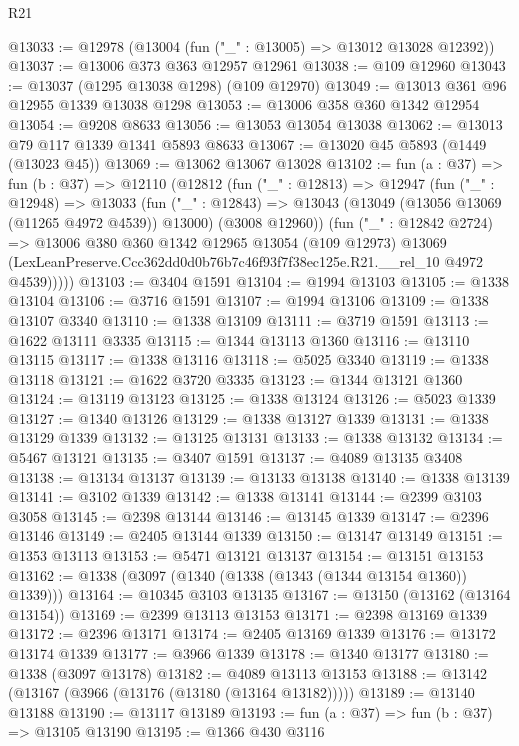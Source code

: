 \begin{lexlean}{R21}
\begin{coremodule}
@13033 := @12978 (@13004 (fun ("_" : @13005) => @13012 @13028 @12392))
@13037 := @13006 @373 @363 @12957 @12961
@13038 := @109 @12960
@13043 := @13037 (@1295 @13038 @1298) (@109 @12970)
@13049 := @13013 @361 @96 @12955 @1339 @13038 @1298
@13053 := @13006 @358 @360 @1342 @12954
@13054 := @9208 @8633
@13056 := @13053 @13054 @13038
@13062 := @13013 @79 @117 @1339 @1341 @5893 @8633
@13067 := @13020 @45 @5893 (@1449 (@13023 @45))
@13069 := @13062 @13067 @13028
@13102 := fun (a : @37) =>
  fun (b : @37) =>
  @12110
    (@12812
      (fun ("_" : @12813) =>
      @12947
        (fun ("_" : @12948) =>
        @13033
          (fun ("_" : @12843) =>
          @13043 (@13049 (@13056 @13069 (@11265 @4972 @4539)) @13000) (@3008 @12960))
          (fun ("_" : @12842 @2724) =>
          @13006
            @380
            @360
            @1342
            @12965
            @13054
            (@109 @12973)
            @13069
            (LexLeanPreserve.Ccc362dd0d0b76b7c46f93f7f38ec125e.R21.__rel_10 @4972 @4539)))))
@13103 := @3404 @1591
@13104 := @1994 @13103
@13105 := @1338 @13104
@13106 := @3716 @1591
@13107 := @1994 @13106
@13109 := @1338 @13107 @3340
@13110 := @1338 @13109
@13111 := @3719 @1591
@13113 := @1622 @13111 @3335
@13115 := @1344 @13113 @1360
@13116 := @13110 @13115
@13117 := @1338 @13116
@13118 := @5025 @3340
@13119 := @1338 @13118
@13121 := @1622 @3720 @3335
@13123 := @1344 @13121 @1360
@13124 := @13119 @13123
@13125 := @1338 @13124
@13126 := @5023 @1339
@13127 := @1340 @13126
@13129 := @1338 @13127 @1339
@13131 := @1338 @13129 @1339
@13132 := @13125 @13131
@13133 := @1338 @13132
@13134 := @5467 @13121
@13135 := @3407 @1591
@13137 := @4089 @13135 @3408
@13138 := @13134 @13137
@13139 := @13133 @13138
@13140 := @1338 @13139
@13141 := @3102 @1339
@13142 := @1338 @13141
@13144 := @2399 @3103 @3058
@13145 := @2398 @13144
@13146 := @13145 @1339
@13147 := @2396 @13146
@13149 := @2405 @13144 @1339
@13150 := @13147 @13149
@13151 := @1353 @13113
@13153 := @5471 @13121 @13137
@13154 := @13151 @13153
@13162 := @1338 (@3097 (@1340 (@1338 (@1343 (@1344 @13154 @1360)) @1339)))
@13164 := @10345 @3103 @13135
@13167 := @13150 (@13162 (@13164 @13154))
@13169 := @2399 @13113 @13153
@13171 := @2398 @13169 @1339
@13172 := @2396 @13171
@13174 := @2405 @13169 @1339
@13176 := @13172 @13174 @1339
@13177 := @3966 @1339
@13178 := @1340 @13177
@13180 := @1338 (@3097 @13178)
@13182 := @4089 @13113 @13153
@13188 := @13142 (@13167 (@3966 (@13176 (@13180 (@13164 @13182)))))
@13189 := @13140 @13188
@13190 := @13117 @13189
@13193 := fun (a : @37) => fun (b : @37) => @13105 @13190
@13195 := @1366 @430 @3116

\end{coremodule}
\end{lexlean}
